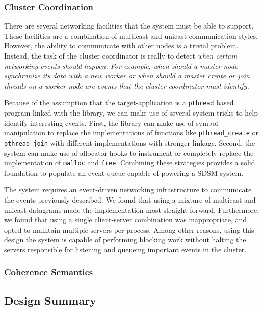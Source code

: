 \subsubsection{Cluster Coordination}
There are several networking facilities that the \projname{} system must be able to support.  These facilities are a combination of multicast and unicast communication styles.  However, the ability to communicate with other nodes is a trivial problem.  Instead, the task of the cluster coordinator is really to detect \em when \em certain networking events should happen.  For example, \em when \em should a master node synchronize its data with a new worker or \em when \em should a master create or join threads on a worker node are events that the cluster coordinator must identify.

Because of the assumption that the target-application is a \verb,pthread, based program linked with the \projname{} library, we can make use of several system tricks to help identify interesting events.  First, the \projname{} library can make use of symbol manipulation to replace the implementations of functions like \verb,pthread_create, or \verb,pthread_join, with different implementations with stronger linkage.  Second, the \projname{} system can make use of allocator hooks to instrument or completely replace the implementation of \verb,malloc, and \verb,free,.  Combining these strategies provides a solid foundation to populate an event queue capable of powering a SDSM system.

The \projname{} system requires an event-driven networking infrastructure to communicate the events previously described.  We found that using a mixture of multicast and unicast datagrams made the implementation most straight-forward.  Furthermore, we found that using a single client-server combination was inappropriate, and opted to maintain multiple servers per-process.  Among other reasons, using this design the \projname{} system is capable of performing blocking work without halting the servers responsible for listening and queueing important events in the cluster.


\subsubsection{Coherence Semantics}

\subsection{Design Summary}
